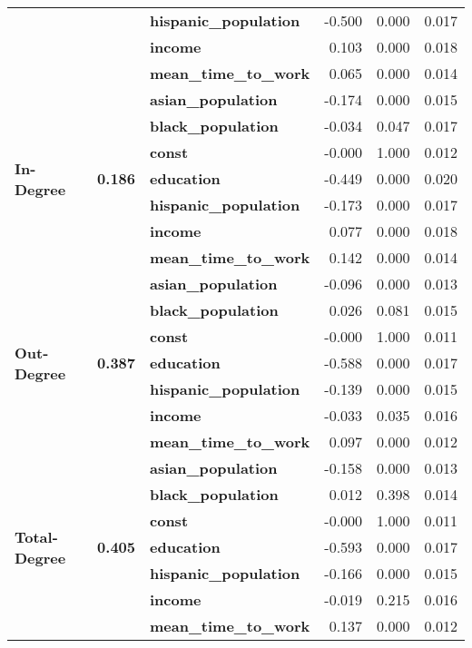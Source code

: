 \begin{tabular}{lllrrr}
             &       & \textbf{hispanic\_population} & -0.500 &    0.000 &    0.017 \\
             &       & \textbf{income} &  0.103 &    0.000 &    0.018 \\
             &       & \textbf{mean\_time\_to\_work} &  0.065 &    0.000 &    0.014 \\
\cline{1-6}
\cline{2-6}
\multirow{7}{*}{\textbf{In-Degree}} & \multirow{7}{*}{\textbf{0.186}} & \textbf{asian\_population} & -0.174 &    0.000 &    0.015 \\
             &       & \textbf{black\_population} & -0.034 &    0.047 &    0.017 \\
             &       & \textbf{const} & -0.000 &    1.000 &    0.012 \\
             &       & \textbf{education} & -0.449 &    0.000 &    0.020 \\
             &       & \textbf{hispanic\_population} & -0.173 &    0.000 &    0.017 \\
             &       & \textbf{income} &  0.077 &    0.000 &    0.018 \\
             &       & \textbf{mean\_time\_to\_work} &  0.142 &    0.000 &    0.014 \\
\cline{1-6}
\cline{2-6}
\multirow{7}{*}{\textbf{Out-Degree}} & \multirow{7}{*}{\textbf{0.387}} & \textbf{asian\_population} & -0.096 &    0.000 &    0.013 \\
             &       & \textbf{black\_population} &  0.026 &    0.081 &    0.015 \\
             &       & \textbf{const} & -0.000 &    1.000 &    0.011 \\
             &       & \textbf{education} & -0.588 &    0.000 &    0.017 \\
             &       & \textbf{hispanic\_population} & -0.139 &    0.000 &    0.015 \\
             &       & \textbf{income} & -0.033 &    0.035 &    0.016 \\
             &       & \textbf{mean\_time\_to\_work} &  0.097 &    0.000 &    0.012 \\
\cline{1-6}
\cline{2-6}
\multirow{7}{*}{\textbf{Total-Degree}} & \multirow{7}{*}{\textbf{0.405}} & \textbf{asian\_population} & -0.158 &    0.000 &    0.013 \\
             &       & \textbf{black\_population} &  0.012 &    0.398 &    0.014 \\
             &       & \textbf{const} & -0.000 &    1.000 &    0.011 \\
             &       & \textbf{education} & -0.593 &    0.000 &    0.017 \\
             &       & \textbf{hispanic\_population} & -0.166 &    0.000 &    0.015 \\
             &       & \textbf{income} & -0.019 &    0.215 &    0.016 \\
             &       & \textbf{mean\_time\_to\_work} &  0.137 &    0.000 &    0.012 \\
\bottomrule
\end{tabular}

